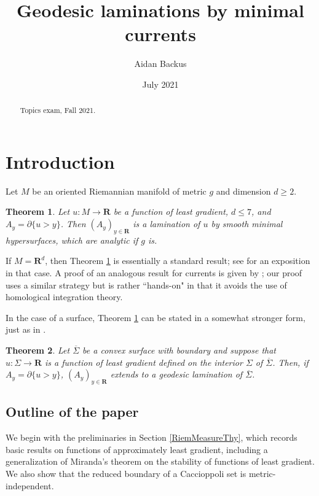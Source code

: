 \documentclass[reqno,12pt,letterpaper]{amsart}
\title[Geodesic laminations by minimal currents]{Geodesic laminations by minimal currents}
\author{Aidan Backus}
\date{July 2021}
\newcommand{\RR}{\mathbf{R}}
\newtheorem{theorem}{Theorem}[section]
\theoremstyle{definition}
\numberwithin{equation}{section}
\begin{document}
\begin{abstract}
Topics exam, Fall 2021.
\end{abstract}

\maketitle



\section{Introduction}
Let $M$ be an oriented Riemannian manifold of metric $g$ and dimension $d \geq 2$.

\begin{theorem}\label{main thm}
Let $u: M \to \RR$ be a function of least gradient, $d \leq 7$, and $A_y = \partial \{u > y\}$.
Then $(A_y)_{y \in \RR}$ is a lamination of $u$ by smooth minimal hypersurfaces, which are analytic if $g$ is.
\end{theorem}

If $M = \RR^d$, then Theorem \ref{main thm} is essentially a standard result; see \cite[Proposition 3.4]{górny2017planar} for an exposition in that case.
A proof of an analogous result for currents is given by \cite[\S5.3]{federer2014geometric}; our proof uses a similar strategy but is rather ``hands-on" in that it avoids the use of homological integration theory.

In the case of a surface, Theorem \ref{main thm} can be stated in a somewhat stronger form, just as in \cite[Corollary 3.5]{górny2017planar}.

\begin{theorem}\label{main crly}
Let $\overline \Sigma$ be a convex surface with boundary and suppose that $u: \Sigma \to \RR$ is a function of least gradient defined on the interior $\Sigma$ of $\overline \Sigma$.
Then, if $A_y = \partial \{u > y\}$, $(A_y)_{y \in \RR}$ extends to a geodesic lamination of $\overline \Sigma$.
\end{theorem}


\subsection{Outline of the paper}
We begin with the preliminaries in Section \ref{RiemMeasureThy}, which records basic results on functions of approximately least gradient, including a generalization of Miranda's theorem \cite[Teorema 3]{Miranda67} on the stability of functions of least gradient.
We also show that the reduced boundary of a Caccioppoli set is metric-independent.
\end{document}
